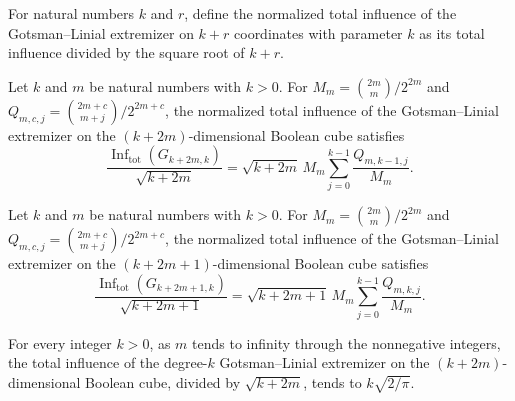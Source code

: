 \begin{definition}
\label{FABL.normalizedGotsmanLinialTotalInfluence}
\leanok
{}
For natural numbers $k$ and $r$, define the normalized total influence of the
Gotsman–Linial extremizer on $k+r$ coordinates with parameter $k$ as its total influence
divided by the square root of $k+r$.
\end{definition}

\begin{theorem}
\label{FABL.normalizedGotsmanLinialTotalInfluence_even}
\leanok
{}
Let $k$ and $m$ be natural numbers with $k>0$. For $M_m=\binom{2m}{m}/2^{2m}$ and
$Q_{m,c,j}=\binom{2m+c}{m+j}/2^{2m+c}$, the normalized total influence of the
Gotsman–Linial extremizer on the $(k+2m)$-dimensional Boolean cube satisfies
\[\frac{\operatorname{Inf}_{\mathrm{tot}}(G_{k+2m,k})}{\sqrt{k+2m}}=\sqrt{k+2m}\,M_m\sum_{j=0}^{k-1}\frac{Q_{m,k-1,j}}{M_m}.\]
\end{theorem}

\begin{theorem}
\label{FABL.normalizedGotsmanLinialTotalInfluence_odd}
\leanok
{}
Let $k$ and $m$ be natural numbers with $k>0$. For $M_m=\binom{2m}{m}/2^{2m}$ and
$Q_{m,c,j}=\binom{2m+c}{m+j}/2^{2m+c}$, the normalized total influence of the
Gotsman–Linial extremizer on the $(k+2m+1)$-dimensional Boolean cube satisfies
\[\frac{\operatorname{Inf}_{\mathrm{tot}}(G_{k+2m+1,k})}{\sqrt{k+2m+1}}=\sqrt{k+2m+1}\,M_m\sum_{j=0}^{k-1}\frac{Q_{m,k,j}}{M_m}.\]
\end{theorem}

\begin{theorem}
\label{FABL.tendsto_normalizedGotsmanLinialTotalInfluence_even}
\leanok
{}
For every integer $k>0$, as $m$ tends to infinity through the nonnegative integers, the
total influence of the degree-$k$ Gotsman–Linial extremizer on the $(k+2m)$-dimensional
Boolean cube, divided by $\sqrt{k+2m}$, tends to $k\sqrt{2/\pi}$.
\end{theorem}

